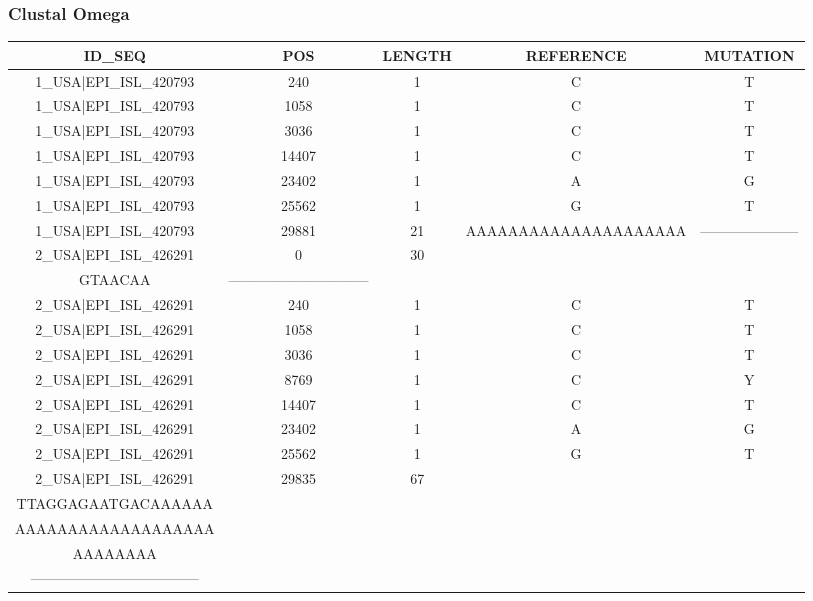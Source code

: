 \documentclass[a4paper,10pt]{article}
\begin{document}
\subsubsection{Clustal Omega}

\setlength\LTleft{-2.3 cm}
\begin{longtable}{@{}ccccc@{}}
\toprule
\textbf{ID\_SEQ} & \textbf{POS} & \textbf{LENGTH} & \textbf{REFERENCE} & \textbf{MUTATION} \\* \midrule
\endfirsthead
%
\cline{1-5}
\endhead
%
1\_USA|EPI\_ISL\_420793 & 240 & 1 & C & T \\* \midrule
1\_USA|EPI\_ISL\_420793 & 1058 & 1 & C & T \\* \midrule
1\_USA|EPI\_ISL\_420793 & 3036 & 1 & C & T \\* \midrule
1\_USA|EPI\_ISL\_420793 & 14407 & 1 & C & T \\* \midrule
1\_USA|EPI\_ISL\_420793 & 23402 & 1 & A & G \\* \midrule
1\_USA|EPI\_ISL\_420793 & 25562 & 1 & G & T \\* \midrule
1\_USA|EPI\_ISL\_420793 & 29881 & 21 & AAAAAAAAAAAAAAAAAAAAA & --------------------- \\* \midrule
2\_USA|EPI\_ISL\_426291 & 0 & 30 & \begin{tabular}[c]{@{}c@{}}ATTAAAGGTTTATACCTTCCCAG\\ GTAACAA\end{tabular} & ------------------------------ \\* \midrule
2\_USA|EPI\_ISL\_426291 & 240 & 1 & C & T \\* \midrule
2\_USA|EPI\_ISL\_426291 & 1058 & 1 & C & T \\* \midrule
2\_USA|EPI\_ISL\_426291 & 3036 & 1 & C & T \\* \midrule
2\_USA|EPI\_ISL\_426291 & 8769 & 1 & C & Y \\* \midrule
2\_USA|EPI\_ISL\_426291 & 14407 & 1 & C & T \\* \midrule
2\_USA|EPI\_ISL\_426291 & 23402 & 1 & A & G \\* \midrule
2\_USA|EPI\_ISL\_426291 & 25562 & 1 & G & T \\* \midrule
2\_USA|EPI\_ISL\_426291 & 29835 & 67 & \begin{tabular}[c]{@{}c@{}}CCATGTGATTTTAATAGCTTC\\ TTAGGAGAATGACAAAAAA\\ AAAAAAAAAAAAAAAAAAA\\ AAAAAAAA\end{tabular} & \begin{tabular}[c]{@{}c@{}}-------------------------------\\ ------------------------------------\end{tabular} \\* \midrule

\end{longtable}
\end{document}
